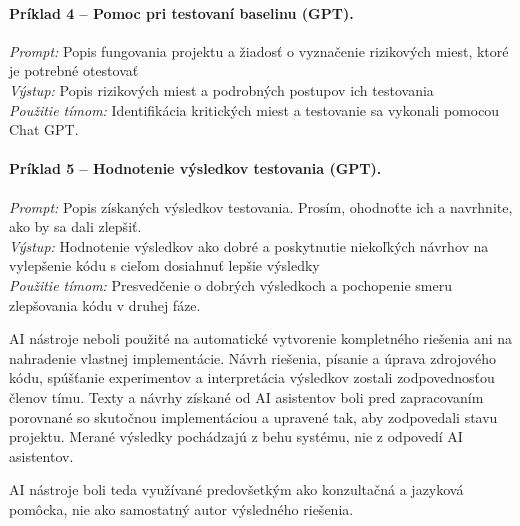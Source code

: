 \paragraph{Príklad 4 -- Pomoc pri testovaní baselinu (GPT).}
\emph{Prompt:} Popis fungovania projektu a žiadosť o vyznačenie rizikových miest, ktoré je potrebné otestovať\\
\emph{Výstup:} Popis rizikových miest a podrobných postupov ich testovania \\
\emph{Použitie tímom:} Identifikácia kritických miest a testovanie sa vykonali pomocou Chat GPT.

\paragraph{Príklad 5 -- Hodnotenie výsledkov testovania (GPT).}
\emph{Prompt:} Popis získaných výsledkov testovania. Prosím, ohodnoťte ich a navrhnite, ako by sa dali zlepšiť.\\
\emph{Výstup:} Hodnotenie výsledkov ako dobré a poskytnutie niekoľkých návrhov na vylepšenie kódu s cieľom dosiahnuť lepšie výsledky \\
\emph{Použitie tímom:} Presvedčenie o dobrých výsledkoch a pochopenie smeru zlepšovania kódu v druhej fáze.

AI nástroje neboli použité na automatické vytvorenie kompletného riešenia ani na nahradenie vlastnej implementácie. Návrh riešenia, písanie a úprava zdrojového kódu, spúšťanie experimentov a interpretácia výsledkov zostali zodpovednosťou členov tímu. Texty a návrhy získané od AI asistentov boli pred zapracovaním porovnané so skutočnou implementáciou a upravené tak, aby zodpovedali stavu projektu. Merané výsledky pochádzajú z behu systému, nie z odpovedí AI asistentov.

AI nástroje boli teda využívané predovšetkým ako konzultačná a jazyková pomôcka, nie ako samostatný autor výsledného riešenia.